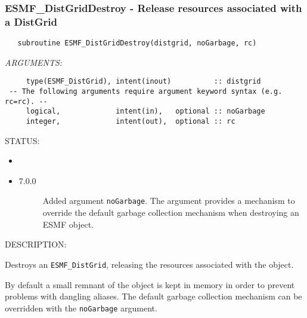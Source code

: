 \subsubsection [ESMF\_DistGridDestroy] {ESMF\_DistGridDestroy - Release resources associated with a DistGrid }


 
\begin{verbatim}   subroutine ESMF_DistGridDestroy(distgrid, noGarbage, rc)\end{verbatim}{\em ARGUMENTS:}
\begin{verbatim}     type(ESMF_DistGrid), intent(inout)          :: distgrid
 -- The following arguments require argument keyword syntax (e.g. rc=rc). --
     logical,             intent(in),   optional :: noGarbage
     integer,             intent(out),  optional :: rc  
           \end{verbatim}
{\sf STATUS:}
   \begin{itemize}
   \item{}
   \item{}
   \begin{description}
   \item[7.0.0] Added argument {\tt noGarbage}.
     The argument provides a mechanism to override the default garbage collection
     mechanism when destroying an ESMF object.
   \end{description}
   \end{itemize}
  
{\sf DESCRIPTION:\\ }


     Destroys an {\tt ESMF\_DistGrid}, releasing the resources associated
     with the object.
  
     By default a small remnant of the object is kept in memory in order to 
     prevent problems with dangling aliases. The default garbage collection
     mechanism can be overridden with the {\tt noGarbage} argument.
  
